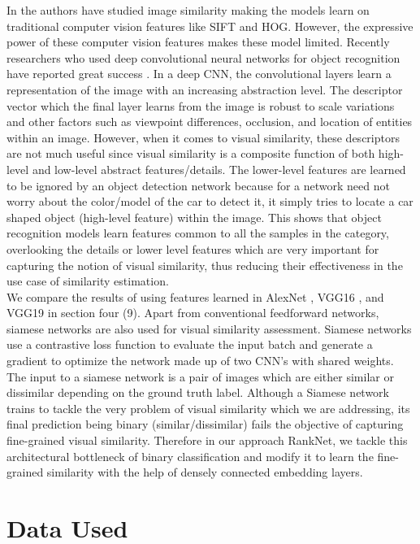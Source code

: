 \documentclass[10pt,twocolumn,letterpaper]{article}
\begin{document}
In \cite{c12,c13,c14} the authors have studied image similarity making the models learn on traditional computer vision features like SIFT and HOG. However, the expressive power of these computer vision features makes these model limited. Recently researchers who used deep convolutional neural networks for object recognition have reported great success \cite{c15,c16,c17}. In a deep CNN, the convolutional layers learn a representation of the image with an increasing abstraction level. The descriptor vector which the final layer learns from the image is robust to scale variations and other factors such as viewpoint differences, occlusion, and location of entities within an image. However, when it comes to visual similarity, these descriptors are not much useful since visual similarity is a composite function of both high-level and low-level abstract features/details. The lower-level features are learned to be ignored by an object detection network because for a network need not worry about the color/model of the car to detect it, it simply tries to locate a car shaped object (high-level feature) within the image. This shows that object recognition models learn features common to all the samples in the category, overlooking the details or lower level features which are very important for capturing the notion of visual similarity, thus reducing their effectiveness in the use case of similarity estimation.\\
We compare the results of using features learned in AlexNet \cite{c15}, VGG16 \cite{c4} , and VGG19 \cite{c4}in section four (9). Apart from conventional feedforward networks, siamese networks \cite{c7} are also used for visual similarity assessment. Siamese networks use a contrastive loss function to evaluate the input batch and generate a gradient to optimize the network made up of two CNN's with shared weights. The input to a siamese network is a pair of images which are either similar or dissimilar depending on the ground truth label. Although a Siamese network trains to tackle the very problem of visual similarity which we are addressing, its final prediction being binary (similar/dissimilar) fails the objective of capturing fine-grained visual similarity. Therefore in our approach RankNet, we tackle this architectural bottleneck of binary classification and modify it to learn the fine-grained similarity with the help of densely connected embedding layers.

\vspace{-2mm}
\section{Data Used}
\vspace{-1mm}
\end{document}
